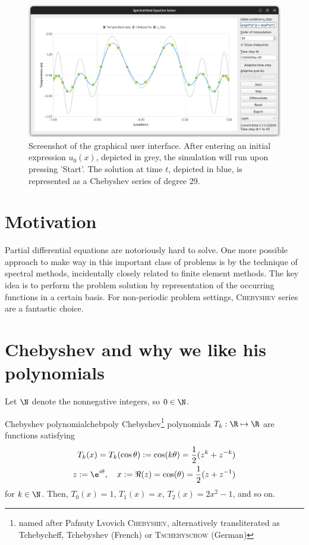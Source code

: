 \documentclass[12pt, a4paper]{article}
\begin{document}
  \begin{figure}[H]
    \centering
    \includegraphics[width=\linewidth]{figures/screenshot.png}
    \caption{Screenshot of the graphical user interface. After entering an initial expression $u_0(x)$, depicted in grey, the simulation will run upon pressing 'Start'. The solution at time $t$, depicted in blue, is represented as a Chebyshev series of degree 29.}
  \end{figure}

  \pagebreak
  \pagestyle{normal}

  \section{Motivation}
  Partial differential equations are notoriously hard to solve. One more possible approach to make way in this important class of problems is by the technique of spectral methods, incidentally closely related to finite element methods.
  The key idea is to perform the problem solution by representation of the occurring functions in a certain basis.
  For non-periodic problem settings, \textsc{Chebyshev} series are a fantastic choice.

  \section{Chebyshev and why we like his polynomials}
  Let $\N$ denote the nonnegative integers, so $0 \in \N$.

  \begin{definition}{Chebyshev polynomial}{chebpoly}
    Chebyshev\footnote{named after Pafnuty Lvovich \textsc{Chebyshev}, alternatively transliterated as Tchebycheff, Tchebyshev (French) or \textsc{Tschebyschow} (German)} polynomials $T_k: \R \mapsto \R$ are functions satisfying
    \begin{align*}
      T_k(x) = T_k(\cos \theta) := \cos(k \theta) = \frac{1}{2} (z^k + z^{-k}) \\
      z := \e^{i \theta},\quad x := \Re(z) = \cos(\theta) = \frac{1}{2}(z + z^{-1})
    \end{align*}
    for $k \in \N$. Then, $T_0(x) = 1$, $T_1(x) = x$, $T_2(x) = 2x^2-1$, and so on.
  \end{definition}
\end{document}

